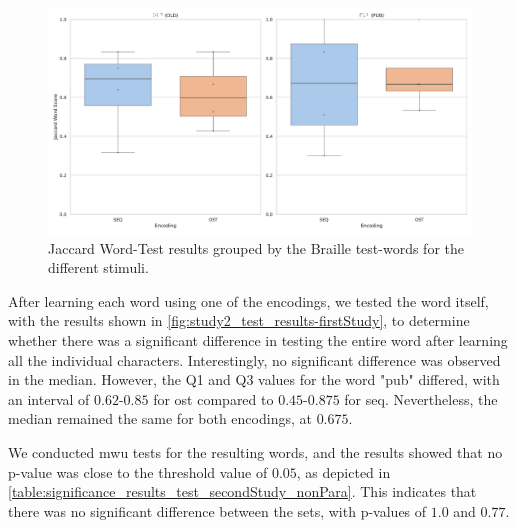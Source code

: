 \begin{figure}
    \centering
    \includegraphics[width=\linewidth]{src/pictures/Study2Data_Experiment/study2_test_results.pdf}
    \caption{Jaccard Word-Test results grouped by the Braille test-words for the different stimuli.}
    \label{fig:study2_test_results-firstStudy}
\end{figure}

After learning each word using one of the encodings, we tested the word itself, with the results shown in \autoref{fig:study2_test_results-firstStudy}, to determine whether there was a significant difference in testing the entire word after learning all the individual characters.
Interestingly, no significant difference was observed in the median. However, the Q1 and Q3 values for the word "pub" differed, with an interval of $0.62$-$0.85$ for \gls{ost} compared to $0.45$-$0.875$ for \gls{seq}.
Nevertheless, the median remained the same for both encodings, at $0.675$.

We conducted \gls{mwu} tests for the resulting words, and the results showed that no p-value was close to the threshold value of $0.05$, as depicted in \autoref{table:significance_results_test_secondStudy_nonPara}. This indicates that there was no significant difference between the sets, with p-values of $1.0$ and $0.77$.

\begin{table}[ht]
\caption{Results of the \gls{mwu} tests for significance for the different Braille tests-words with a Cohens d Effect Size.}
\label{table:significance_results_test_secondStudy_nonPara}
\end{table}


